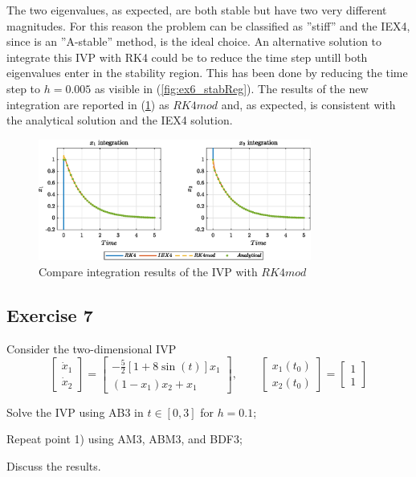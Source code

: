 \documentclass[11pt,a4paper,oneside]{article}
\begin{document}
The two eigenvalues, as expected, are both stable but have two very different magnitudes.
For this reason the problem can be classified as ''stiff'' and the IEX4, since is an ''A-stable'' method, is the ideal choice.
An alternative solution to integrate this IVP with RK4 could be to reduce the time step untill both eigenvalues enter in the stability region.
This has been done by reducing the time step to $h=0.005$ as visible in (\cref{fig:ex6_stabReg}).
The results of the new integration are reported in (\cref{fig:ex6_integrationMod}) as $RK4mod$ and, as expected, is consistent with the analytical solution and the IEX4 solution.
\begin{figure}[htb]
    \centering
    \includegraphics*[width=0.8\textwidth, keepaspectratio]{ex6_integOutputMod.eps}
    \caption[]{\label{fig:ex6_integrationMod} Compare integration results of the IVP with $RK4mod$}
\end{figure}


\clearpage
\subsection{Exercise 7}

Consider the two-dimensional IVP 
$$\begin{bmatrix}\dot{x}_1 \\ \dot{x}_2\end{bmatrix}=\begin{bmatrix}-\frac{5}{2}\left[1+8\sin(t)\right]x_1 \\ (1-x_1)x_2+x_1\end{bmatrix}, \qquad \begin{bmatrix} x_1(t_0)\\ x_2(t_0)\end{bmatrix}=\begin{bmatrix} 1\\ 1\end{bmatrix}$$
\begin{enumerate*}[label=\arabic*)]
    \item Solve the IVP using AB3 in $t\in[0,3]$ for $h=0.1$;
    \item Repeat point 1) using AM3, ABM3, and BDF3;
    \item Discuss the results.
\end{enumerate*}
\end{document}
